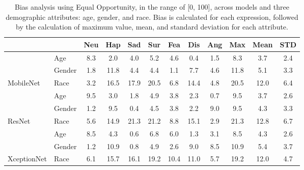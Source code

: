 \begin{table}[b] 
\caption{Bias analysis using Equal Opportunity, in the range of [0, 100], across models and three demographic attributes: age, gender, and race. Bias is calculated for each expression, followed by the calculation of maximum value, mean, and standard deviation for each attribute.}
\label{tbl:bias_equal_opportunity}
\centering
\small
\setlength{\tabcolsep}{3pt} %
\resizebox{1\linewidth}{!}
{
\begin{tabular}{ll|>{\color{mediumgray}}c>{\color{mediumgray}}c>{\color{mediumgray}}c>{\color{mediumgray}}c>{\color{mediumgray}}c>{\color{mediumgray}}c>{\color{mediumgray}}c|ccc}
                                                    &        & \color{black}Neu & \color{black}Hap & \color{black}Sad 
                                                             & \color{black}Sur & \color{black}Fea & \color{black}Dis 
                                                             & \color{black}Ang & Max & Mean & STD \\ \hline
\multicolumn{1}{l|}{}                               & Age    & 8.3 & 2.0 & 4.0 & 5.2 & 4.6 & 0.4 & 1.5 & 8.3 & 3.7 & 2.4 \\
\multicolumn{1}{l|}{}                               & Gender & 1.8 & 11.8 & 4.4 & 4.4 & 1.1 & 7.7 & 4.6 & 11.8 & 5.1 & 3.3 \\
\multicolumn{1}{l|}{\multirow{-3}{*}{MobileNet}}    & Race   & 3.2 & 16.5 & 17.9 & 20.5 & 6.8 & 14.4 & 4.8 & 20.5 & 12.0 & 6.4 \\ \hline
\multicolumn{1}{l|}{}                               & Age    & 9.5 & 3.0 & 1.8 & 4.9 & 3.8 & 2.3 & 0.7 & 9.5 & 3.7 & 2.6 \\
\multicolumn{1}{l|}{}                               & Gender & 1.2 & 9.5 & 0.4 & 4.5 & 3.8 & 2.2 & 9.0 & 9.5 & 4.3 & 3.3 \\
\multicolumn{1}{l|}{\multirow{-3}{*}{ResNet}}       & Race   & 5.6 & 14.9 & 21.3 & 21.2 & 8.8 & 15.1 & 2.9 & 21.3 & 12.8 & 6.7 \\ \hline
\multicolumn{1}{l|}{}                               & Age    & 8.5 & 4.3 & 0.6 & 6.8 & 6.0 & 1.3 & 3.1 & 8.5 & 4.3 & 2.6 \\
\multicolumn{1}{l|}{}                               & Gender & 1.2 & 10.9 & 0.8 & 4.9 & 2.6 & 9.0 & 8.5 & 10.9 & 5.4 & 3.7 \\
\multicolumn{1}{l|}{\multirow{-3}{*}{XceptionNet}}  & Race   & 6.1 & 15.7 & 16.1 & 19.2 & 10.4 & 11.0 & 5.7 & 19.2 & 12.0 & 4.7 \\ \hline

\end{tabular}}
\end{table}

